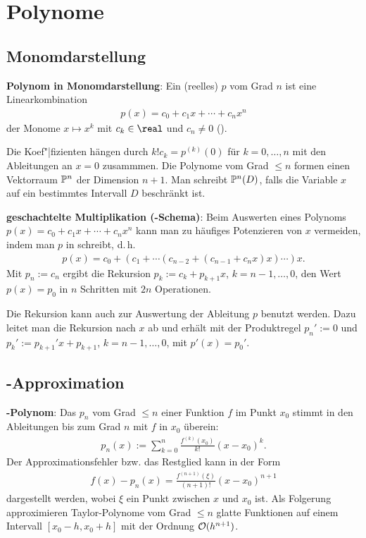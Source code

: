 \section{%
    Polynome%
}

\subsection{%
    Monomdarstellung%
}

\textbf{Polynom in Monomdarstellung}:
Ein (reelles)  $p$ vom Grad $n$ ist eine Linearkombination
\begin{align*}
    p(x) = c_0 + c_1 x + \dotsb + c_n x^n
\end{align*}
der Monome $x \mapsto x^k$ mit  $c_k \in \real$ und $c_n \not= 0$
().

Die Koef"|fizienten hängen durch $k! c_k = p^{(k)}(0)$ für $k = 0, \dotsc, n$ mit den Ableitungen
an $x = 0$ zusammmen.
Die Polynome vom Grad $\le n$ formen einen Vektorraum $\P^n$ der Dimension $n + 1$.
Man schreibt $\P^n(D)$, falls die Variable $x$ auf ein bestimmtes Intervall $D$ beschränkt ist.

\linie

\textbf{geschachtelte Multiplikation (-Schema)}:
Beim Auswerten eines Polynoms\\
$p(x) = c_0 + c_1 x + \dotsb + c_n x^n$ kann man zu häufiges Potenzieren von $x$
vermeiden, indem man $p$ in  schreibt, d.\,h.
\begin{align*}
    p(x) = c_0 + (c_1 + \dotsb (c_{n-2} + (c_{n-1} + c_n x)x) \dotsb)x.
\end{align*}
Mit $p_n := c_n$ ergibt die Rekursion $p_k := c_k + p_{k+1} x$, $k = n - 1, \dotsc, 0$,
den Wert $p(x) = p_0$ in $n$ Schritten mit $2n$ Operationen.

Die Rekursion kann auch zur Auswertung der Ableitung $p$ benutzt werden.
Dazu leitet man die Rekursion nach $x$ ab und erhält mit der Produktregel
$p_n' := 0$ und $p_k' := p_{k+1}' x + p_{k+1}$, $k = n - 1, \dotsc, 0$,
mit $p'(x) = p_0'$.

\subsection{%
    -Approximation%
}

\textbf{-Polynom}:
Das  $p_n$ vom Grad $\le n$ einer Funktion $f$ im Punkt $x_0$
stimmt in den Ableitungen bis zum Grad $n$ mit $f$ in $x_0$ überein:
\begin{align*}
    p_n(x) := \sum_{k=0}^n \frac{f^{(k)}(x_0)}{k!} (x - x_0)^k.
\end{align*}
Der Approximationsfehler bzw. das Restglied kann in der Form
\begin{align*}
    f(x) - p_n(x) = \frac{f^{(n+1)}(\xi)}{(n + 1)!} (x - x_0)^{n+1}
\end{align*}
dargestellt werden, wobei $\xi$ ein Punkt zwischen $x$ und $x_0$ ist.
Als Folgerung approximieren Taylor-Polynome vom Grad $\le n$ glatte Funktionen auf einem
Intervall $[x_0 - h, x_0 + h]$ mit der Ordnung $\O(h^{n+1})$.

